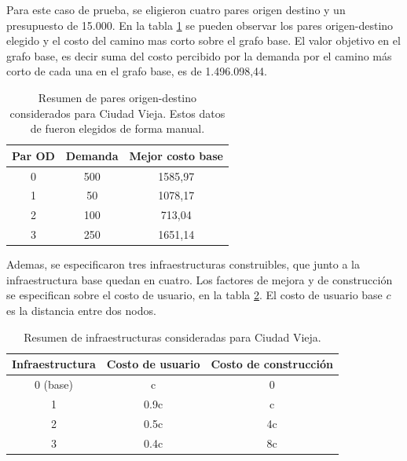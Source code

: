 \documentclass{article}
\begin{document}
  Para este caso de prueba, se eligieron cuatro pares origen destino y un presupuesto de 15.000. En la tabla \ref{table:odsciudadvieja} se pueden observar los pares origen-destino elegido y el costo del camino mas corto sobre el grafo base. El valor objetivo en el grafo base, es decir suma del costo percibido por la demanda por el camino más corto de cada una en el grafo base, es de 1.496.098,44.

  \begin{table}[h!]
    \centering
    \begin{tabular}{ccc}
      \toprule
      Par OD & Demanda & Mejor costo base \\
      \midrule
      0 & 500 & 1585,97 \\
      1 & 50 & 1078,17 \\
      2 & 100 & 713,04 \\
      3 & 250 & 1651,14 \\
      \bottomrule
    \end{tabular}
    \caption{Resumen de pares origen-destino considerados para Ciudad Vieja. Estos datos de fueron elegidos de forma manual.}\label{table:odsciudadvieja}
  \end{table}
  
  Ademas, se especificaron tres infraestructuras construibles, que junto a la infraestructura base quedan en cuatro. Los factores de mejora y de construcción se especifican sobre el costo de usuario, en la tabla \ref{table:infrasciudadvieja}. El costo de usuario base $c$ es la distancia entre dos nodos.

  \begin{table}[h!]
    \centering
    \begin{tabular}{ccc}
      \toprule
      Infraestructura & Costo de usuario & Costo de construcción \\
      \midrule
      0 (base) & c & 0 \\
      1 & 0.9c & c \\
      2 & 0.5c & 4c \\
      3 & 0.4c & 8c \\
      \bottomrule
    \end{tabular}
    \caption{Resumen de infraestructuras consideradas para Ciudad Vieja.}\label{table:infrasciudadvieja}
  \end{table}
\end{document}
